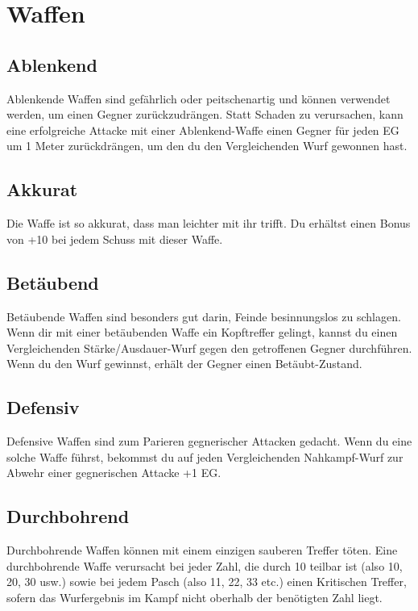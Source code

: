 \documentclass[a4paper, fontsize=9pt twocolumn]{scrartcl}
\begin{document}
\section{Waffen}
\begin{multicols*}{2}


    \subsection{Ablenkend}
    Ablenkende Waffen sind gefährlich oder peitschenartig und können verwendet werden, um einen Gegner zurückzudrängen.
    Statt Schaden zu verursachen, kann eine erfolgreiche Attacke mit einer Ablenkend-Waffe einen Gegner für jeden EG um 1 Meter zurückdrängen, um den du den Vergleichenden Wurf gewonnen hast.

    \subsection{Akkurat}
    Die Waffe ist so akkurat, dass man leichter mit ihr trifft.
    Du erhältst einen Bonus von +10 bei jedem Schuss mit dieser Waffe.

    \subsection{Betäubend}
    Betäubende Waffen sind besonders gut darin, Feinde besinnungslos zu schlagen.
    Wenn dir mit einer betäubenden Waffe ein Kopftreffer gelingt, kannst du einen Vergleichenden Stärke/Ausdauer-Wurf gegen den getroffenen Gegner durchführen. Wenn du den Wurf gewinnst, erhält der Gegner einen Betäubt-Zustand.

    \subsection{Defensiv}
    Defensive Waffen sind zum Parieren gegnerischer Attacken gedacht.
    Wenn du eine solche Waffe führst, bekommst du auf jeden Vergleichenden Nahkampf-Wurf zur Abwehr einer gegnerischen Attacke +1 EG.

    \subsection{Durchbohrend}
    Durchbohrende Waffen können mit einem einzigen sauberen Treffer töten.
    Eine durchbohrende Waffe verursacht bei jeder Zahl, die durch 10 teilbar ist (also 10, 20, 30 usw.) sowie bei jedem Pasch (also 11, 22, 33 etc.) einen Kritischen Treffer, sofern das Wurfergebnis im Kampf nicht oberhalb der benötigten Zahl liegt.


\end{multicols*}
\end{document}
